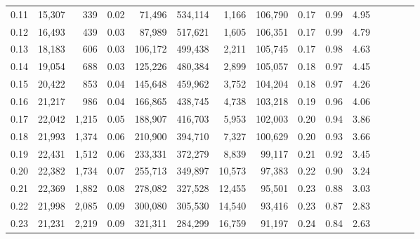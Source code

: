 \begin{tabular}{rrrcrrrrrrrrrrr}
0.11 &  15,307 &    339 &                                       0.02 &   71,496 &  534,114 &    1,166 &  106,790 &  0.17 &  0.99 &                         4.95 \\
0.12 &  16,493 &    439 &                                       0.03 &   87,989 &  517,621 &    1,605 &  106,351 &  0.17 &  0.99 &                         4.79 \\
0.13 &  18,183 &    606 &                                       0.03 &  106,172 &  499,438 &    2,211 &  105,745 &  0.17 &  0.98 &                         4.63 \\
0.14 &  19,054 &    688 &                                       0.03 &  125,226 &  480,384 &    2,899 &  105,057 &  0.18 &  0.97 &                         4.45 \\
0.15 &  20,422 &    853 &                                       0.04 &  145,648 &  459,962 &    3,752 &  104,204 &  0.18 &  0.97 &                         4.26 \\
0.16 &  21,217 &    986 &                                       0.04 &  166,865 &  438,745 &    4,738 &  103,218 &  0.19 &  0.96 &                         4.06 \\
0.17 &  22,042 &  1,215 &                                       0.05 &  188,907 &  416,703 &    5,953 &  102,003 &  0.20 &  0.94 &                         3.86 \\
0.18 &  21,993 &  1,374 &                                       0.06 &  210,900 &  394,710 &    7,327 &  100,629 &  0.20 &  0.93 &                         3.66 \\
0.19 &  22,431 &  1,512 &                                       0.06 &  233,331 &  372,279 &    8,839 &   99,117 &  0.21 &  0.92 &                         3.45 \\
0.20 &  22,382 &  1,734 &                                       0.07 &  255,713 &  349,897 &   10,573 &   97,383 &  0.22 &  0.90 &                         3.24 \\
0.21 &  22,369 &  1,882 &                                       0.08 &  278,082 &  327,528 &   12,455 &   95,501 &  0.23 &  0.88 &                         3.03 \\
0.22 &  21,998 &  2,085 &                                       0.09 &  300,080 &  305,530 &   14,540 &   93,416 &  0.23 &  0.87 &                         2.83 \\
0.23 &  21,231 &  2,219 &                                       0.09 &  321,311 &  284,299 &   16,759 &   91,197 &  0.24 &  0.84 &                         2.63 \\

\end{tabular}
